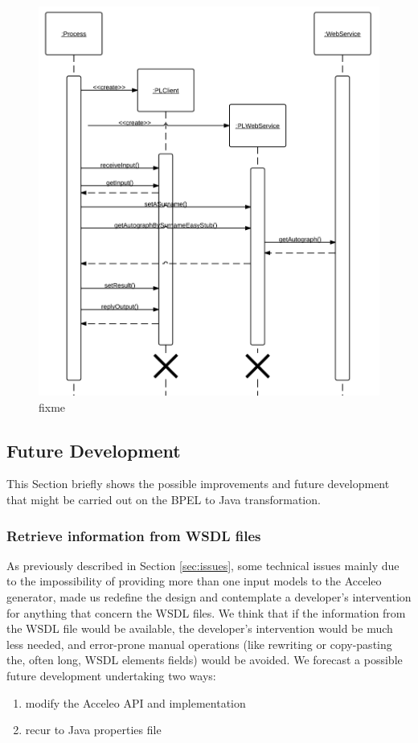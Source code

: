 \begin{figure}
  \begin{center}
    \includegraphics[scale=1]{pictures/GeneratorSequenceDiagram.png}
    \caption{fixme}
    \label{fig:GeneratorSequenceDiagram}
  \end{center}
\end{figure}


\subsection{Future Development}
\label{sec:FutureDevelopment}
This Section briefly shows the possible improvements and future development that might be carried out on the BPEL to Java transformation.

\subsubsection{Retrieve information from WSDL files}
\label{sec:FutRetrieveWSDLInfo}
As previously described in Section \ref{sec:issues}, some technical issues mainly due to the impossibility of providing more than one input models to the Acceleo generator, made us redefine the design and contemplate a developer's intervention 
for anything that concern the WSDL files.
We think that if the information from the WSDL file would be available, the developer's intervention would be much less needed, and error-prone manual operations (like rewriting or copy-pasting the, often long, WSDL elements fields) would be avoided. 
We forecast a possible future development undertaking two ways:
\begin{enumerate}
 \item \label{itm:num1}modify the Acceleo API and implementation
 \item \label{itm:num2}recur to Java properties file 
\end{enumerate}

